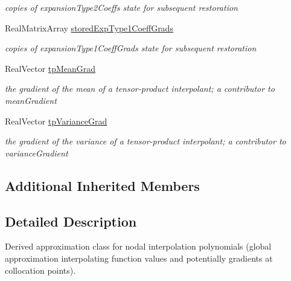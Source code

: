 \begin{DoxyCompactItemize}
\begin{DoxyCompactList}\small\item\em copies of expansion\+Type2\+Coeffs state for subsequent restoration \end{DoxyCompactList}\item 
Real\+Matrix\+Array \hyperlink{classPecos_1_1NodalInterpPolyApproximation_a8dc2b2f98351f6761016c72f97a85757}{stored\+Exp\+Type1\+Coeff\+Grads}\label{classPecos_1_1NodalInterpPolyApproximation_a8dc2b2f98351f6761016c72f97a85757}

\begin{DoxyCompactList}\small\item\em copies of expansion\+Type1\+Coeff\+Grads state for subsequent restoration \end{DoxyCompactList}\item 
Real\+Vector \hyperlink{classPecos_1_1NodalInterpPolyApproximation_abe4e2e7034cc34287a55bc222635c275}{tp\+Mean\+Grad}\label{classPecos_1_1NodalInterpPolyApproximation_abe4e2e7034cc34287a55bc222635c275}

\begin{DoxyCompactList}\small\item\em the gradient of the mean of a tensor-\/product interpolant; a contributor to mean\+Gradient \end{DoxyCompactList}\item 
Real\+Vector \hyperlink{classPecos_1_1NodalInterpPolyApproximation_ae2ca11b7c6367e7601a2c3e6430fe8c0}{tp\+Variance\+Grad}\label{classPecos_1_1NodalInterpPolyApproximation_ae2ca11b7c6367e7601a2c3e6430fe8c0}

\begin{DoxyCompactList}\small\item\em the gradient of the variance of a tensor-\/product interpolant; a contributor to variance\+Gradient \end{DoxyCompactList}\end{DoxyCompactItemize}
\subsection*{Additional Inherited Members}


\subsection{Detailed Description}
Derived approximation class for nodal interpolation polynomials (global approximation interpolating function values and potentially gradients at collocation points). 

